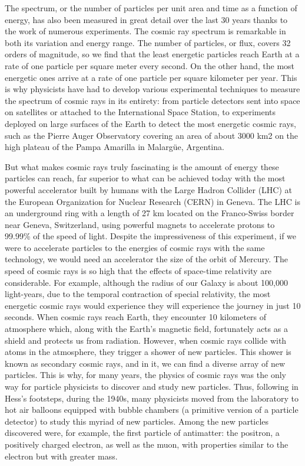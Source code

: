 \documentclass[
  letterpaper,
  DIV=11,
  numbers=noendperiod]{scrreprt}
\begin{document}
The spectrum, or the number of particles per unit area and time as a
function of energy, has also been measured in great detail over the last
30 years thanks to the work of numerous experiments. The cosmic ray
spectrum is remarkable in both its variation and energy range. The
number of particles, or flux, covers 32 orders of magnitude, so we find
that the least energetic particles reach Earth at a rate of one particle
per square meter every second. On the other hand, the most energetic
ones arrive at a rate of one particle per square kilometer per year.
This is why physicists have had to develop various experimental
techniques to measure the spectrum of cosmic rays in its entirety: from
particle detectors sent into space on satellites or attached to the
International Space Station, to experiments deployed on large surfaces
of the Earth to detect the most energetic cosmic rays, such as the
Pierre Auger Observatory covering an area of about 3000 km2 on the high
plateau of the Pampa Amarilla in Malargüe, Argentina.

But what makes cosmic rays truly fascinating is the amount of energy
these particles can reach, far superior to what can be achieved today
with the most powerful accelerator built by humans with the Large Hadron
Collider (LHC) at the European Organization for Nuclear Research (CERN)
in Geneva. The LHC is an underground ring with a length of 27 km located
on the Franco-Swiss border near Geneva, Switzerland, using powerful
magnets to accelerate protons to 99.99\% of the speed of light. Despite
the impressiveness of this experiment, if we were to accelerate
particles to the energies of cosmic rays with the same technology, we
would need an accelerator the size of the orbit of Mercury. The speed of
cosmic rays is so high that the effects of space-time relativity are
considerable. For example, although the radius of our Galaxy is about
100,000 light-years, due to the temporal contraction of special
relativity, the most energetic cosmic rays would experience they will
experience the journey in just 10 seconds. When cosmic rays reach Earth,
they encounter 10 kilometers of atmosphere which, along with the Earth's
magnetic field, fortunately acts as a shield and protects us from
radiation. However, when cosmic rays collide with atoms in the
atmosphere, they trigger a shower of new particles. This shower is known
as secondary cosmic rays, and in it, we can find a diverse array of new
particles. This is why, for many years, the physics of cosmic rays was
the only way for particle physicists to discover and study new
particles. Thus, following in Hess's footsteps, during the 1940s, many
physicists moved from the laboratory to hot air balloons equipped with
bubble chambers (a primitive version of a particle detector) to study
this myriad of new particles. Among the new particles discovered were,
for example, the first particle of antimatter: the positron, a
positively charged electron, as well as the muon, with properties
similar to the electron but with greater mass.
\end{document}
